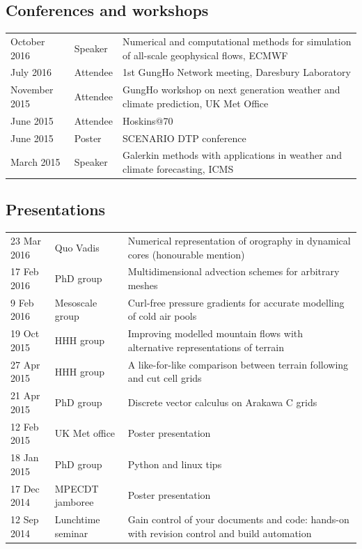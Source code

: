 \documentclass[a4paper,11pt]{article}
\begin{document}
{\subsection*{Conferences and workshops}
\begin{tabularx}{\linewidth}{l l X}
October 2016 & Speaker & Numerical and computational methods for simulation of all-scale geophysical flows, ECMWF \\
July 2016 & Attendee & 1st GungHo Network meeting, Daresbury Laboratory \\
November 2015 & Attendee & GungHo workshop on next generation weather and climate prediction, UK Met Office \\
June 2015 & Attendee & Hoskins@70 \\
June 2015 & Poster & SCENARIO DTP conference \\
March 2015 & Speaker & Galerkin methods with applications in weather and climate forecasting, ICMS \\
\end{tabularx}

\subsection*{Presentations}
\begin{tabularx}{\linewidth}{l l X}
23 Mar 2016 & Quo Vadis & Numerical representation of orography in dynamical cores (honourable mention) \\
17 Feb 2016 & PhD group & Multidimensional advection schemes for arbitrary meshes \\
9 Feb 2016 & Mesoscale group & Curl-free pressure gradients for accurate modelling of cold air pools \\
19 Oct 2015 & HHH group & Improving modelled mountain flows with alternative representations of terrain \\
27 Apr 2015 & HHH group & A like-for-like comparison between terrain following and cut cell grids \\
21 Apr 2015 & PhD group & Discrete vector calculus on Arakawa C grids \\
12 Feb 2015 & UK Met office & Poster presentation \\
18 Jan 2015 & PhD group & Python and linux tips \\
17 Dec 2014 & MPECDT jamboree & Poster presentation \\
12 Sep 2014 & Lunchtime seminar  & Gain control of your documents and code: hands-on with revision control and build automation \\
\end{tabularx}

}
\end{document}
